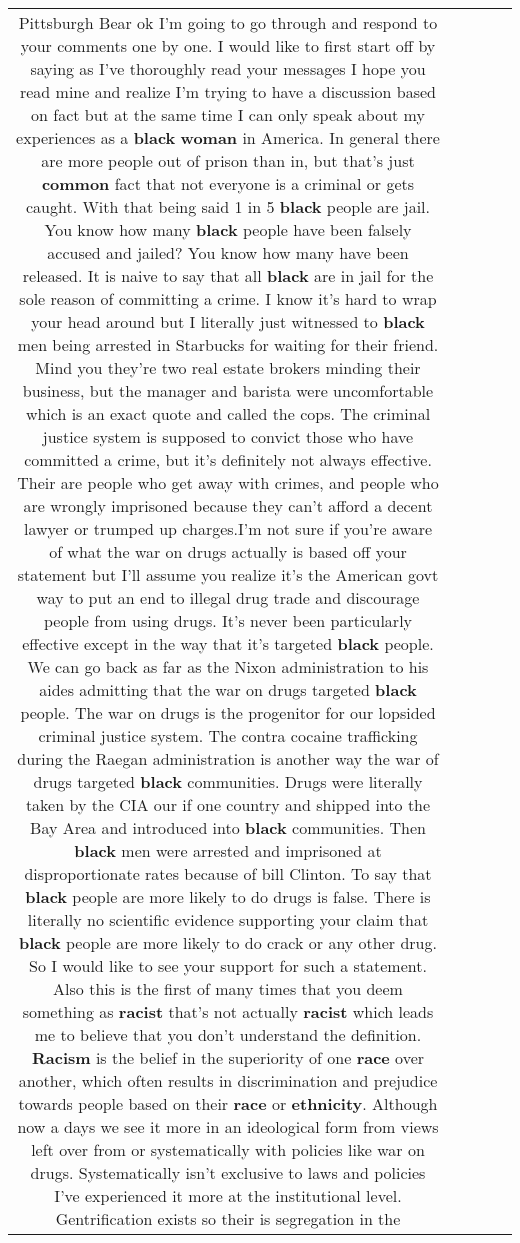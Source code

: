 \documentclass[11pt]{article}
\newlength\mylength
\begin{document}
\begin{center}
\begin{longtable}{|C{.65\mylength}|C{.30\mylength}|C{.12\mylength}|C{.12\mylength}|C{.12\mylength}|}
  \small Pittsburgh Bear ok I'm going to go through and respond to your comments one by one. I would like to first start off by saying as I've thoroughly read your messages I hope you read mine and realize I'm trying to have a discussion based on fact but at the same time I can only speak about my experiences as a \textbf{black} \textbf{woman} in America. In general there are more people out of prison than in, but that's just \textbf{common} fact that not everyone is a criminal or gets caught. With that being said 1 in 5 \textbf{black} people are jail. You know how many \textbf{black} people have been falsely accused and jailed? You know how many have been released. It is naive to say that all \textbf{black} are in jail for the sole reason of committing a crime. I know it's hard to wrap your head around but I literally just witnessed to \textbf{black} men being arrested in Starbucks for waiting for their friend. Mind you they're two real estate brokers minding their business, but the manager and barista were uncomfortable which is an exact quote and called the cops. The criminal justice system is supposed to convict those who have committed a crime, but it's definitely not always effective. Their are people who get away with crimes, and people who are wrongly imprisoned because they can't afford a decent lawyer or trumped up charges.I'm not sure if you're aware of what the war on drugs actually is based off your statement but I'll assume you realize it's the American govt way to put an end to illegal drug trade and discourage people from using drugs. It's never been particularly effective except in the way that it's targeted \textbf{black} people. We can go back as far as the Nixon administration to his aides admitting that the war on drugs targeted \textbf{black} people. The war on drugs is the progenitor for our lopsided criminal justice system. The contra cocaine trafficking during the Raegan administration is another way the war of drugs targeted \textbf{black} communities. Drugs were literally taken by the CIA our if one country and shipped into the Bay Area and introduced into \textbf{black} communities. Then \textbf{black} men were arrested and imprisoned at disproportionate rates because of bill Clinton. To say that \textbf{black} people are more likely to do drugs is false. There is literally no scientific evidence supporting your claim that \textbf{black} people are more likely to do crack or any other drug. So I would like to see your support for such a statement. Also this is the first of many times that you deem something as \textbf{racist} that's not actually \textbf{racist} which leads me to believe that you don't understand the definition. \textbf{Racism} is the belief in the superiority of one \textbf{race} over another, which often results in discrimination and prejudice towards people based on their \textbf{race} or \textbf{ethnicity}. Although now a days we see it more in an ideological form from views left over from or systematically with policies like war on drugs. Systematically isn't exclusive to laws and policies I've experienced it more at the institutional level. Gentrification exists so their is segregation in the 
\end{longtable}
\end{center}
\end{document}
